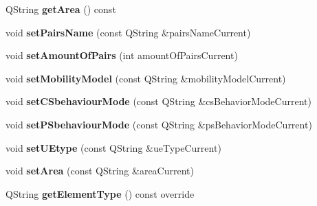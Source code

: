 \begin{DoxyCompactItemize}
\item 
Q\+String {\bfseries get\+Area} () const \hypertarget{class_u_egroup_data_aa2d379be3eccbeeb11875117b468e436}{}\label{class_u_egroup_data_aa2d379be3eccbeeb11875117b468e436}

\item 
void {\bfseries set\+Pairs\+Name} (const Q\+String \&pairs\+Name\+Current)\hypertarget{class_u_egroup_data_a6156eaa6a7d30e0a635465c5ee988661}{}\label{class_u_egroup_data_a6156eaa6a7d30e0a635465c5ee988661}

\item 
void {\bfseries set\+Amount\+Of\+Pairs} (int amount\+Of\+Pairs\+Current)\hypertarget{class_u_egroup_data_a86fce37bd2b1666e8d1bd09c3a68c520}{}\label{class_u_egroup_data_a86fce37bd2b1666e8d1bd09c3a68c520}

\item 
void {\bfseries set\+Mobility\+Model} (const Q\+String \&mobility\+Model\+Current)\hypertarget{class_u_egroup_data_a3132e4fd10443cdf1b54da74e702f526}{}\label{class_u_egroup_data_a3132e4fd10443cdf1b54da74e702f526}

\item 
void {\bfseries set\+C\+Sbehaviour\+Mode} (const Q\+String \&cs\+Behavior\+Mode\+Current)\hypertarget{class_u_egroup_data_abe9b9d2c4e6f6454528c07eae918bfa7}{}\label{class_u_egroup_data_abe9b9d2c4e6f6454528c07eae918bfa7}

\item 
void {\bfseries set\+P\+Sbehaviour\+Mode} (const Q\+String \&ps\+Behavior\+Mode\+Current)\hypertarget{class_u_egroup_data_abfbf67457dfc135bdae8ed3d791217c8}{}\label{class_u_egroup_data_abfbf67457dfc135bdae8ed3d791217c8}

\item 
void {\bfseries set\+U\+Etype} (const Q\+String \&ue\+Type\+Current)\hypertarget{class_u_egroup_data_a30990cb4b826e0808277950dd54adcfa}{}\label{class_u_egroup_data_a30990cb4b826e0808277950dd54adcfa}

\item 
void {\bfseries set\+Area} (const Q\+String \&area\+Current)\hypertarget{class_u_egroup_data_a087d2cc8e7b466d75f669b713f007111}{}\label{class_u_egroup_data_a087d2cc8e7b466d75f669b713f007111}

\item 
Q\+String {\bfseries get\+Element\+Type} () const override\hypertarget{class_u_egroup_data_ace6bbc85295357eb6be8037a1eaed953}{}\label{class_u_egroup_data_ace6bbc85295357eb6be8037a1eaed953}


\end{DoxyCompactItemize}
